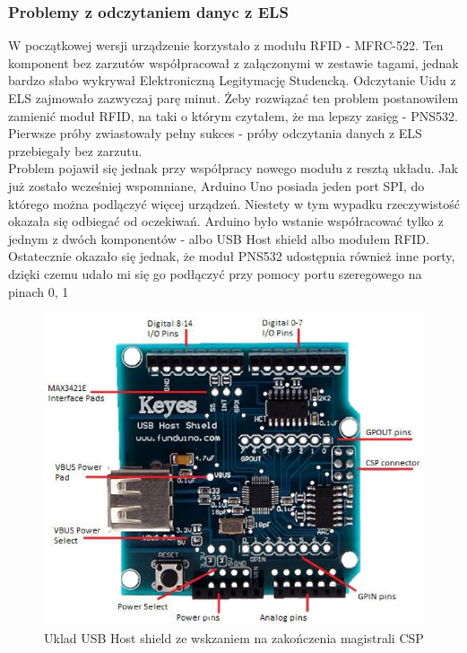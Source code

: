 \documentclass[declaration,shortabstract, mgr]{iithesis}
\begin{document}
\subsubsection{Problemy z odczytaniem danyc z ELS}
\indent W początkowej wersji urządzenie korzystało z modułu RFID - MFRC-522. Ten komponent bez zarzutów współpracował z załączonymi w zestawie tagami, jednak bardzo słabo wykrywał Elektroniczną Legitymację Studencką. Odczytanie Uidu z ELS zajmowało zazwyczaj parę minut.  Żeby rozwiązać ten problem postanowiłem zamienić moduł RFID, na taki o którym czytałem, że ma lepszy zasięg - PNS532. Pierwsze próby zwiastowały pełny sukces - próby odczytania danych z ELS przebiegały bez zarzutu. \\
\indent Problem pojawił się jednak przy współpracy nowego modułu z resztą układu. Jak już zostało wcześniej wspomniane, Arduino Uno posiada jeden port SPI, do którego można podlączyć więcej urządzeń. Niestety w tym wypadku rzeczywistość okazała się odbiegać od oczekiwań. Arduino było wstanie współracować tylko z jednym z dwóch komponentów - albo USB Host shield albo modułem RFID. Ostatecznie okazało się jednak, że moduł PNS532 udostępnia również inne porty, dzięki czemu udało mi się go podłączyć przy pomocy portu szeregowego na pinach 0, 1
 \begin{figure}[h]
\caption{Uklad USB Host shield ze wskzaniem na zakończenia magistrali CSP}
\centering
\includegraphics[scale=0.6]{usb_host_shield.jpg}
\end{figure}
\end{document}
